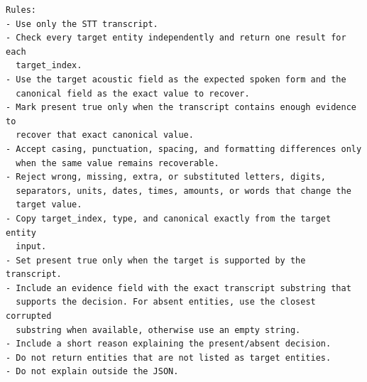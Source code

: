 \documentclass[10pt,twocolumn]{article}
\begin{document}
\begin{verbatim}
Rules:
- Use only the STT transcript.
- Check every target entity independently and return one result for each
  target_index.
- Use the target acoustic field as the expected spoken form and the
  canonical field as the exact value to recover.
- Mark present true only when the transcript contains enough evidence to
  recover that exact canonical value.
- Accept casing, punctuation, spacing, and formatting differences only
  when the same value remains recoverable.
- Reject wrong, missing, extra, or substituted letters, digits,
  separators, units, dates, times, amounts, or words that change the
  target value.
- Copy target_index, type, and canonical exactly from the target entity
  input.
- Set present true only when the target is supported by the transcript.
- Include an evidence field with the exact transcript substring that
  supports the decision. For absent entities, use the closest corrupted
  substring when available, otherwise use an empty string.
- Include a short reason explaining the present/absent decision.
- Do not return entities that are not listed as target entities.
- Do not explain outside the JSON.
\end{verbatim}
\endgroup
\end{document}
